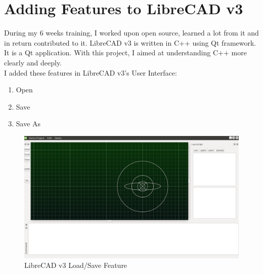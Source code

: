 \section{Adding Features to LibreCAD v3}
During my 6 weeks training, I worked upon open source, learned a lot from it and in return contributed to it. LibreCAD v3 is written in C++ using Qt framework. It is a Qt application. With this project, I aimed at understanding C++ more clearly and deeply.\\

I added these features in LibreCAD v3's User Interface:
\begin{enumerate}
\item Open
\item Save 
\item Save As
\end{enumerate}
\begin{figure}[!ht]
\centering
\includegraphics[scale=0.3]{images/ui.png}
\vspace{-1em}
\caption{LibreCAD v3 Load/Save Feature}
\hspace{-1.5em}
\end{figure}

